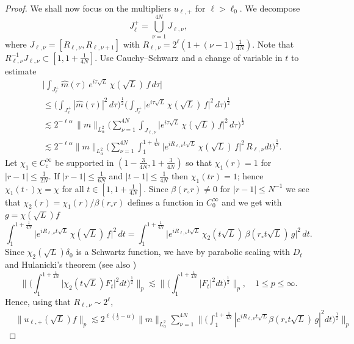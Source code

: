 \documentclass[leqno]{amsart}
\theoremstyle{definition}
\theoremstyle{remark}
\numberwithin{equation}{section}
\renewcommand{\hat}{\widehat}
\newcommand\lc{\lesssim}
\newcommand\Coi{{C^\infty_{\mathrm c}}}
\begin{document}
\begin{proof}
We shall now focus on the multipliers $u_{\ell,+}$ for $\ell>\ell_0$. 
We decompose
\[
J_\ell^+=\bigcup_{\nu=1}^{4N} J_{\ell,\nu},
\]
where $J_{\ell,\nu}=[R_{\ell,\nu}, R_{\ell,\nu+1}]$ with 
$R_{\ell,\nu} = 2^\ell (1+(\nu-1) \frac{1}{4N})$. Note that $R_{\ell,\nu}^{-1} J_{\ell,\nu} \subset [1, 1+\frac{1}{4N}]$.  
Use Cauchy--Schwarz and a change of variable in $t$ to estimate
\begin{align*}
& \Big| \int_{J_{\ell}^{+} }\hat{m}(\tau ) \, e^{i\tau \sqrt{L}} \, \chi(\sqrt{L}) \, f \, d\tau  \Big| \\
& \le \Big( \int_{J_{\ell}^{+}} |\hat{m}(\tau )|^2 \, d\tau  \Big)^{\frac 12} \Big( \int_{J_{\ell}^+ }\big| e^{i\tau  \sqrt{L}} \, \chi(\sqrt{L}) \, f \big|^2 \, d\tau  \Big)^{\frac 12} \\
& \lesssim 2^{- \ell \alpha} \, \| m \|_{L^2_ \alpha} 
\Big( \sum_{\nu=1}^{4N}\int_{J_{\ell,\nu} }\big| e^{i\tau  \sqrt{L}} \, \chi(\sqrt{L}) \, f \big|^2 \, d\tau  \Big)^{\frac 12} 
\\ &\lc 2^{-\ell \alpha}  \| m \|_{L^2_ \alpha} 
\Big( \sum_{\nu=1}^{4N}\int_{1}^{1+\frac{1}{4N}} \big| e^{iR_{\ell,\nu} t \sqrt{L}} \, \chi(\sqrt{L}) \, f \big|^2 \, R_{\ell,\nu}dt \Big)^{\frac 12} .
\end{align*} 
Let $\chi_1\in \Coi$ be supported in $(1-\frac{3}{4N}, 1+\frac{3}{4N})$ so that  $\chi_1(r)=1$ for $|r-1|\le \frac{1}{2N}$. If $|r-1|\le \frac{1}{6N}$ and $|t-1|\le \frac{1}{4N}$ then $\chi_1(tr)=1$;  hence $\chi_1(t\cdot )\chi=\chi$  for all $t\in [1, 1+\frac{1}{4N}]$. 
Since $\beta(r_\circ r)\neq 0$ for $|r-1|\le N^{-1}$  we see that $\chi_2(r)= \chi_1(r)/ \beta(r_\circ r)$ defines a function in $C^\infty_0$ and we get with $g=\chi(\sqrt L) f$
\[ \int_{1}^{1+\frac{1}{4N}} \big| e^{iR_{\ell,\nu} t \sqrt{L}} \, \chi(\sqrt{L}) \, f \big|^2 \, dt =  \int_{1}^{1+\frac{1}{4N} } \big| e^{iR_{\ell,\nu} t \sqrt{L}} \, \chi_2( t\sqrt L)\, \beta(r_\circ t\sqrt{ L}) \, g \big|^2 \, dt.
\]
Since $\chi_2(\sqrt L)\delta_0$ is a Schwartz function, we have by parabolic scaling with $D_t$ and Hulanicki's theorem (see also \cite{MaMe90})  
\[ \Big\| \Big(\int_{1}^{1+\frac{1}{4N}} \big| \chi_2( t\sqrt L)  F_t \big|^2 dt\Big)^{\frac 1 2}\Big\|_p \lc 
\Big\| \Big(\int_{1}^{1+\frac{1}{4N}} \big| F_t \big|^2 dt\Big)^{\frac 1 2}\Big\|_p,\quad 
1\le p\le \infty.\]
Hence, using that $R_{\ell,\nu} \sim 2^\ell$,
\begin{align*} 
&\|u_{\ell,+}(\sqrt L) f\|_p \lc 2^{\ell (\frac 12-\alpha)} \| m \|_{L^2_ \alpha}  \sum_{\nu=1}^{4N} \Big\| \Big(\int_1^{1+\frac{1}{4N}} |e^{iR_{\ell,\nu} t \sqrt { L}}  \beta (r_\circ t\sqrt {L} )\,g|^2 dt\Big)^{\frac 12} \Big\|_p 

\end{align*}
\end{proof}
\end{document}
